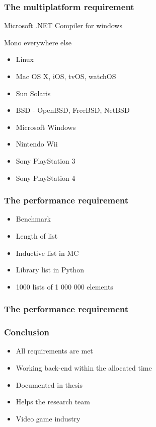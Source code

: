 \documentclass[xetex,serif,aspectratio=169]{beamer}
\begin{document}
\begin{frame}
\end{frame}\begin{frame}\frametitle{The multiplatform requirement}
    Microsoft .NET Compiler for windows

    Mono everywhere else

\begin{itemize}
    \item Linux
    \item Mac OS X, iOS, tvOS, watchOS
    \item Sun Solaris
    \item BSD - OpenBSD, FreeBSD, NetBSD
    \item Microsoft Windows
    \item Nintendo Wii
    \item Sony PlayStation 3
    \item Sony PlayStation 4
\end{itemize}

\end{frame}\begin{frame}\frametitle{The performance requirement}
\begin{itemize}
    \item Benchmark
    \item Length of list
    \item Inductive list in MC
    \item Library list in Python
    \item 1000 lists of 1 000 000 elements
\end{itemize}

\end{frame}\begin{frame}\frametitle{The performance requirement}

\end{frame}\begin{frame}\frametitle{Conclusion}
\begin{itemize}
    \item All requirements are met
    \item Working back-end within the allocated time
    \item Documented in thesis
    \item Helps the research team
    \item Video game industry
\end{itemize}


\end{frame}
\end{document}
